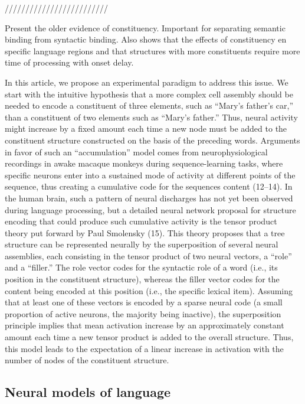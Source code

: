 \documentclass[10pt]{article}
\begin{document}
/////////////////////////

Present the older evidence of constituency. Important for
separating semantic binding from syntactic binding.
Also shows that the effects of constituency en specific
language regions and that structures
with more constituents require more time of processing with onset delay.


In this article, we propose an experimental paradigm to address this issue. We start with the intuitive hypothesis that a more complex cell assembly should be needed to encode a constituent of three elements, such as “Mary's father's car,” than a constituent of two elements such as “Mary's father.” Thus, neural activity might increase by a fixed amount each time a new node must be added to the constituent structure constructed on the basis of the preceding words. Arguments in favor of such an “accumulation” model comes from neurophysiological recordings in awake macaque monkeys during sequence-learning tasks, where specific neurons enter into a sustained mode of activity at different points of the sequence, thus creating a cumulative code for the sequences content (12–14). In the human brain, such a pattern of neural discharges has not yet been observed during language processing, but a detailed neural network proposal for structure encoding that could produce such cumulative activity is the tensor product theory put forward by Paul Smolensky (15). This theory proposes that a tree structure can be represented neurally by the superposition of several neural assemblies, each consisting in the tensor product of two neural vectors, a “role” and a “filler.” The role vector codes for the syntactic role of a word (i.e., its position in the constituent structure), whereas the filler vector codes for the content being encoded at this position (i.e., the specific lexical item). Assuming that at least one of these vectors is encoded by a sparse neural code (a small proportion of active neurons, the majority being inactive), the superposition principle implies that mean activation increase by an approximately constant amount each time a new tensor product is added to the overall structure. Thus, this model leads to the expectation of a linear increase in activation with the number of nodes of the constituent structure.



\subsection{Neural models of language}
\end{document}
